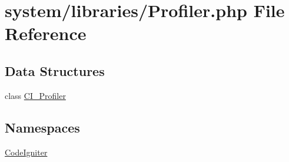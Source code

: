 \hypertarget{system_2libraries_2profiler_8php}{}\section{system/libraries/\+Profiler.php File Reference}
\label{system_2libraries_2profiler_8php}
\subsection*{Data Structures}
\begin{DoxyCompactItemize}
\item 
class \mbox{\hyperlink{class_c_i___profiler}{C\+I\+\_\+\+Profiler}}
\end{DoxyCompactItemize}
\subsection*{Namespaces}
\begin{DoxyCompactItemize}
\item 
 \mbox{\hyperlink{namespace_code_igniter}{Code\+Igniter}}
\end{DoxyCompactItemize}
